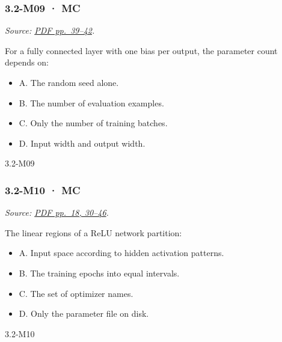 \noindent\begin{minipage}{\linewidth}

\subsubsection{3.2-M09 · MC}\label{m09-mc-8}

\emph{Source:
\href{../Lecture\%20Slides/3.2.\%20Shallow\%20NN.pdf\#page=39}{PDF
pp.~39--42}.}

For a fully connected layer with one bias per output, the parameter
count depends on:

\begin{itemize}
\tightlist
\item
  A. The random seed alone.
\item
  B. The number of evaluation examples.
\item
  C. Only the number of training batches.
\item
  D. Input width and output width.
\end{itemize}

\begin{solution}[8mm]{3.2-M09}

\end{solution}
\end{minipage}\par\medskip

\noindent\begin{minipage}{\linewidth}

\subsubsection{3.2-M10 · MC}\label{m10-mc-8}

\emph{Source:
\href{../Lecture\%20Slides/3.2.\%20Shallow\%20NN.pdf\#page=18}{PDF
pp.~18, 30--46}.}

The linear regions of a ReLU network partition:

\begin{itemize}
\tightlist
\item
  A. Input space according to hidden activation patterns.
\item
  B. The training epochs into equal intervals.
\item
  C. The set of optimizer names.
\item
  D. Only the parameter file on disk.
\end{itemize}

\begin{solution}[8mm]{3.2-M10}

\end{solution}
\end{minipage}\par\medskip

